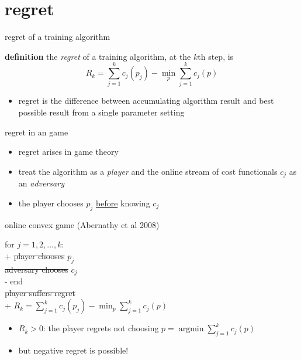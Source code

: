 \documentclass[xcolor={svgnames},
               hyperref={colorlinks,citecolor=DeepPink4,linkcolor=FireBrick,urlcolor=Maroon}]
               {beamer}
\newcommand{\ds}{\displaystyle}
\begin{document}
\section{regret}

\begin{frame}{regret of a training algorithm}

\begin{block}{\textbf{definition}}
the \emph{regret} of a training algorithm, at the $k$th step, is
    $$R_k = \sum_{j=1}^k c_j(p_j) - \min_p \sum_{j=1}^k c_j(p)$$
\end{block}

\begin{itemize}
\item regret is the difference between accumulating algorithm result and best possible result from a single parameter setting
\end{itemize}
\end{frame}


\begin{frame}{regret in an game}

\begin{itemize}
\item regret arises in game theory
\item treat the algorithm as a \emph{player} and the online stream of cost functionals $c_j$ as an \emph{adversary}
\item the player chooses $p_j$ \underline{before} knowing $c_j$
\end{itemize}

\begin{block}{online convex game (Abernathy et al 2008)}
\begin{pseudo*}
for $j = 1,2,\dots,k$: \\+
    \st{player chooses} $p_{j}$ \\
    \st{adversary chooses} $c_{j}$ \\-
end \\
\st{player suffers regret} \\+
    $\ds R_k = \sum_{j=1}^k c_j(p_j) - \min_p \sum_{j=1}^k c_j(p)$
\end{pseudo*}
\end{block}

\begin{itemize}
\item $R_k>0$: the player regrets not choosing $p = \operatorname{argmin} \sum_{j=1}^k c_j(p)$
\item but negative regret is possible!
\end{itemize}
\end{frame}
\end{document}
